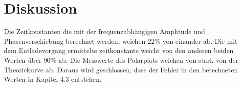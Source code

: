\section{Diskussion}
\label{sec:Diskussion}

Die Zeitkonstanten die mit der frequenzabhängigen Amplitude und Phasenverschiebung berechnet werden, weichen $22\%$
von einander ab. Die mit dem Entladevorgang ermittelte zeitkonstante weicht von den anderen beiden Werten über $90\%$ ab.
Die Messwerte des Polarplots weichen von stark von der Theoriekurve ab. Daraus wird geschlossen, dass der Fehler in den
berechneten Werten in Kapitel 4.3 entstehen.
